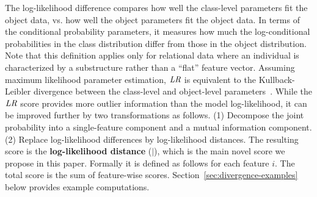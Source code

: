\documentclass[conference]{IEEEtran}
\begin{document}
The log-likelihood difference compares  how well the class-level parameters fit the object data, vs. how well the object parameters fit the object data. In terms of the conditional probability parameters, it measures how much the log-conditional probabilities in the class distribution differ from those in the object distribution. Note that this definition applies only for relational data where an individual is characterized by a substructure rather than a ``flat'' feature vector. Assuming maximum likelihood parameter estimation, $\it{LR}$ is equivalent to the Kullback-Leibler divergence between the class-level and object-level parameters~\cite{Campos2006}. 
%
While the $\it{LR}$ score provides more outlier information than the model log-likelihood, it can be improved further by two transformations as follows. (1) Decompose the joint probability into a single-feature component and a mutual information component. (2) Replace log-likelihood differences by log-likelihood distances. The resulting score is the \textbf{log-likelihood distance} ($\mid$), which is the main novel score we propose in this paper. Formally it is defined as follows for each feature $i$. The total score is the sum of feature-wise scores. Section~\ref{sec:divergence-examples} 
 below provides example computations.
\end{document}
